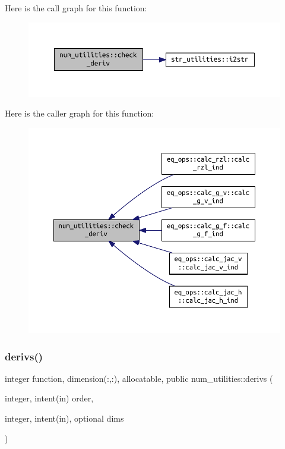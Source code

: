 Here is the call graph for this function\+:\nopagebreak
\begin{figure}[H]
\begin{center}
\leavevmode
\includegraphics[width=350pt]{namespacenum__utilities_a00f4cfe18a734eaa5d66f529e52f7c31_cgraph}
\end{center}
\end{figure}
Here is the caller graph for this function\+:\nopagebreak
\begin{figure}[H]
\begin{center}
\leavevmode
\includegraphics[width=350pt]{namespacenum__utilities_a00f4cfe18a734eaa5d66f529e52f7c31_icgraph}
\end{center}
\end{figure}
\mbox{\label{namespacenum__utilities_ac827c18dd05a9b5a06675eac942f3b51}} 
\subsubsection{\texorpdfstring{derivs()}{derivs()}}
{\footnotesize\ttfamily integer function, dimension(\+:,\+:), allocatable, public num\+\_\+utilities\+::derivs (\begin{DoxyParamCaption}\item[{integer, intent(in)}]{order,  }\item[{integer, intent(in), optional}]{dims }\end{DoxyParamCaption})}



